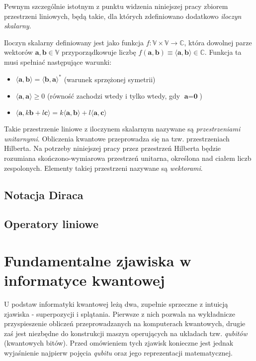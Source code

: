\documentclass[12pt,a4paper,twoside,openany]{book}
\begin{document}
Pewnym szczególnie istotnym z punktu widzenia niniejszej pracy zbiorem przestrzeni liniowych, będą takie, dla których zdefiniowano dodatkowo \textit{iloczyn skalarny}.\newline

Iloczyn skalarny definiowany jest jako funkcja $f: \mathbb{V}\times\mathbb{V}\to\mathbb{C}$, która dowolnej parze wektorów $\textbf{a}, \textbf{b} \in \mathbb{V}$ przyporządkowuje liczbę $f(\textbf{a}, \textbf{b})\equiv\langle\textbf{a},\textbf{b}\rangle\in\mathbb{C}$. Funkcja ta musi spełniać następujące warunki:
\begin{itemize}
    \item $\langle\textbf{a},\textbf{b}\rangle = \langle\textbf{b},\textbf{a}\rangle ^\ast$  (warunek sprzężonej symetrii)
    \item $\langle\textbf{a},\textbf{a}\rangle \geq 0$ (równość zachodzi wtedy i tylko wtedy, gdy $\textbf{a} = \textbf{0}$)
    \item $\langle\textbf{a},k\textbf{b} + l\textbf{c}\rangle = k\langle\textbf{a},\textbf{b}\rangle + l\langle\textbf{a},\textbf{c}\rangle$
\end{itemize}

Takie przestrzenie liniowe z iloczynem skalarnym nazywane są \textit{przestrzeniami unitarnymi}. Obliczenia kwantowe przeprowadza się na tzw. przestrzeniach Hilberta. Na potrzeby niniejszej pracy przez przestrzeń Hilberta będzie rozumiana skończono-wymiarowa przestrzeń unitarna, określona nad ciałem liczb zespolonych. Elementy takiej przestrzeni nazywane są \textit{wektorami}.

\subsection{Notacja Diraca}

\subsection{Operatory liniowe}

\section{Fundamentalne zjawiska w informatyce kwantowej}

U podstaw informatyki kwantowej leżą dwa, zupełnie sprzeczne z intuicją zjawiska - superpozycji i splątania. Pierwsze z nich pozwala na wykładnicze przyspieszenie obliczeń przeprowadzanych na komputerach kwantowych, drugie zaś jest niezbędne do konstrukcji maszyn operujących na układach tzw. \textit{qubitów} (kwantowych bitów). Przed omówieniem tych zjawisk konieczne jest jednak wyjaśnienie najpierw pojęcia \textit{qubitu} oraz jego reprezentacji matematycznej.
\end{document}
